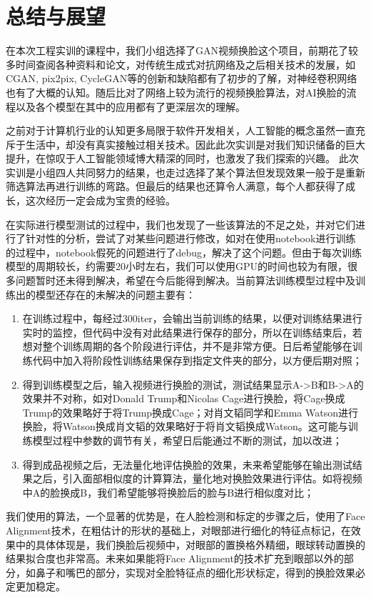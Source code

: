 \chapter{总结与展望}
\label{conclusions}  
在本次工程实训的课程中，我们小组选择了GAN视频换脸这个项目，前期花了较多时间查阅各种资料和论文，对传统生成式对抗网络及之后相关技术的发展，如CGAN, pix2pix, CycleGAN等的创新和缺陷都有了初步的了解，对神经卷积网络也有了大概的认知。随后比对了网络上较为流行的视频换脸算法，对AI换脸的流程以及各个模型在其中的应用都有了更深层次的理解。

之前对于计算机行业的认知更多局限于软件开发相关，人工智能的概念虽然一直充斥于生活中，却没有真实接触过相关技术。因此此次实训是对我们知识储备的巨大提升，在惊叹于人工智能领域博大精深的同时，也激发了我们探索的兴趣。
此次实训是小组四人共同努力的结果，也走过选择了某个算法但发现效果一般于是重新筛选算法再进行训练的弯路。但最后的结果也还算令人满意，每个人都获得了成长，这次经历一定会成为宝贵的经验。

在实际进行模型测试的过程中，我们也发现了一些该算法的不足之处，并对它们进行了针对性的分析，尝试了对某些问题进行修改，如对在使用notebook进行训练的过程中，notebook假死的问题进行了debug，解决了这个问题。但由于每次训练模型的周期较长，约需要20小时左右，我们可以使用GPU的时间也较为有限，很多问题暂时还未得到解决，希望在今后能得到解决。当前算法训练模型过程中及训练出的模型还存在的未解决的问题主要有：
\begin{enumerate}
	\item 在训练过程中，每经过300iter，会输出当前训练的结果，以便对训练结果进行实时的监控，但代码中没有对此结果进行保存的部分，所以在训练结束后，若想对整个训练周期的各个阶段进行评估，并不是非常方便。日后希望能够在训练代码中加入将阶段性训练结果保存到指定文件夹的部分，以方便后期对照；
	\item 得到训练模型之后，输入视频进行换脸的测试，测试结果显示A->B和B->A的效果并不对称，如对Donald Trump和Nicolas Cage进行换脸，将Cage换成Trump的效果略好于将Trump换成Cage；对肖文韬同学和Emma Watson进行换脸，将Watson换成肖文韬的效果略好于将肖文韬换成Watson。这可能与训练模型过程中参数的调节有关，希望日后能通过不断的测试，加以改进；
	\item  得到成品视频之后，无法量化地评估换脸的效果，未来希望能够在输出测试结果之后，引入面部相似度的计算算法，量化地对换脸效果进行评估。如将视频中A的脸换成B，我们希望能够将换脸后的脸与B进行相似度对比；
\end{enumerate}

我们使用的算法，一个显著的优势是，在人脸检测和标定的步骤之后，使用了Face Alignment技术，在粗估计的形状的基础上，对眼部进行细化的特征点标记，在效果中的具体体现是，我们换脸后视频中，对眼部的置换格外精细，眼球转动置换的结果拟合度也非常高。未来如果能将Face Alignment的技术扩充到眼部以外的部分，如鼻子和嘴巴的部分，实现对全脸特征点的细化形状标定，得到的换脸效果必定更加稳定。

